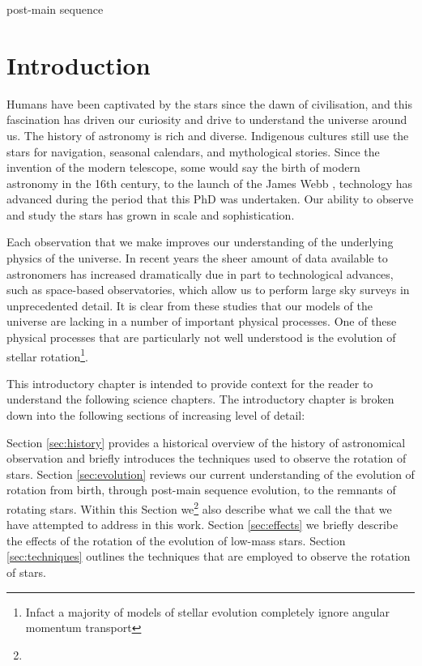 post-main sequence

\newcommand\dive{\textmd{div}}
\newcommand\der{\textmd{d}}



\chapter{Introduction}

Humans have been captivated by the stars since the dawn of civilisation, and this fascination has driven our curiosity and drive to understand the universe around us. 
The history of astronomy is rich and diverse. 
Indigenous cultures still use the stars for navigation, seasonal calendars, and mythological stories. 
Since the invention of the modern telescope, some would say the birth of modern astronomy in the 16th century, to the launch of the James Webb , technology has advanced during the period that this PhD was undertaken. 
Our ability to observe and study the stars has grown in scale and sophistication. 

Each observation that we make improves our understanding of the underlying physics of the universe. 
In recent years the sheer amount of data available to astronomers has increased dramatically due in part to technological advances, such as space-based observatories, which allow us to perform large sky surveys in unprecedented detail. 
It is clear from these studies that our models of the universe are lacking in a number of important physical processes. 
One of these physical processes that are particularly not well understood is the evolution of stellar rotation\footnote{Infact a majority of models of stellar evolution completely ignore angular momentum transport}.

This introductory chapter is intended to provide context for the reader to understand the following science chapters. 
The introductory chapter is broken down into the following sections of increasing level of detail:

Section \ref{sec:history} provides a historical overview of the history of astronomical observation and briefly introduces the techniques used to observe the rotation of stars.
Section \ref{sec:evolution} reviews our current understanding of the evolution of rotation from birth, through post-main sequence evolution, to the remnants of rotating stars. Within this Section we\footnote{} also describe what we call the  that we have attempted to address in this work.
Section \ref{sec:effects} we briefly describe the effects of the rotation of the evolution of low-mass stars.
Section \ref{sec:techniques} outlines the techniques that are employed to observe the rotation of stars.


